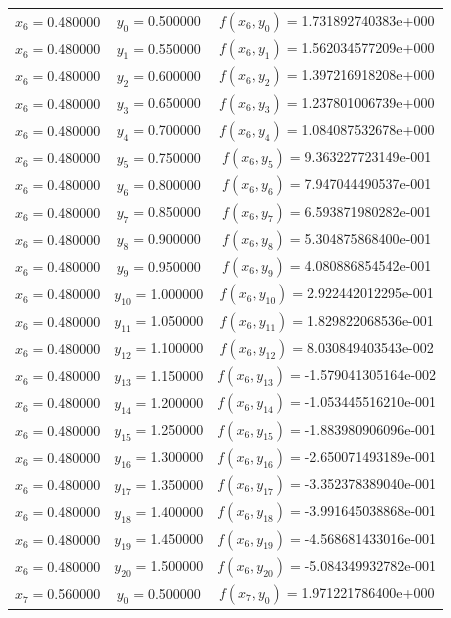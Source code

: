 \begin{longtable}{ccc}
$x_{6}=$0.480000 & $y_{0}=$0.500000 & $f(x_{6},y_{0})=$1.731892740383e+000 \\
$x_{6}=$0.480000 & $y_{1}=$0.550000 & $f(x_{6},y_{1})=$1.562034577209e+000 \\
$x_{6}=$0.480000 & $y_{2}=$0.600000 & $f(x_{6},y_{2})=$1.397216918208e+000 \\
$x_{6}=$0.480000 & $y_{3}=$0.650000 & $f(x_{6},y_{3})=$1.237801006739e+000 \\
$x_{6}=$0.480000 & $y_{4}=$0.700000 & $f(x_{6},y_{4})=$1.084087532678e+000 \\
$x_{6}=$0.480000 & $y_{5}=$0.750000 & $f(x_{6},y_{5})=$9.363227723149e-001 \\
$x_{6}=$0.480000 & $y_{6}=$0.800000 & $f(x_{6},y_{6})=$7.947044490537e-001 \\
$x_{6}=$0.480000 & $y_{7}=$0.850000 & $f(x_{6},y_{7})=$6.593871980282e-001 \\
$x_{6}=$0.480000 & $y_{8}=$0.900000 & $f(x_{6},y_{8})=$5.304875868400e-001 \\
$x_{6}=$0.480000 & $y_{9}=$0.950000 & $f(x_{6},y_{9})=$4.080886854542e-001 \\
$x_{6}=$0.480000 & $y_{10}=$1.000000 & $f(x_{6},y_{10})=$2.922442012295e-001 \\
$x_{6}=$0.480000 & $y_{11}=$1.050000 & $f(x_{6},y_{11})=$1.829822068536e-001 \\
$x_{6}=$0.480000 & $y_{12}=$1.100000 & $f(x_{6},y_{12})=$8.030849403543e-002 \\
$x_{6}=$0.480000 & $y_{13}=$1.150000 & $f(x_{6},y_{13})=$-1.579041305164e-002 \\
$x_{6}=$0.480000 & $y_{14}=$1.200000 & $f(x_{6},y_{14})=$-1.053445516210e-001 \\
$x_{6}=$0.480000 & $y_{15}=$1.250000 & $f(x_{6},y_{15})=$-1.883980906096e-001 \\
$x_{6}=$0.480000 & $y_{16}=$1.300000 & $f(x_{6},y_{16})=$-2.650071493189e-001 \\
$x_{6}=$0.480000 & $y_{17}=$1.350000 & $f(x_{6},y_{17})=$-3.352378389040e-001 \\
$x_{6}=$0.480000 & $y_{18}=$1.400000 & $f(x_{6},y_{18})=$-3.991645038868e-001 \\
$x_{6}=$0.480000 & $y_{19}=$1.450000 & $f(x_{6},y_{19})=$-4.568681433016e-001 \\
$x_{6}=$0.480000 & $y_{20}=$1.500000 & $f(x_{6},y_{20})=$-5.084349932782e-001 \\
$x_{7}=$0.560000 & $y_{0}=$0.500000 & $f(x_{7},y_{0})=$1.971221786400e+000 \\

\end{longtable}
